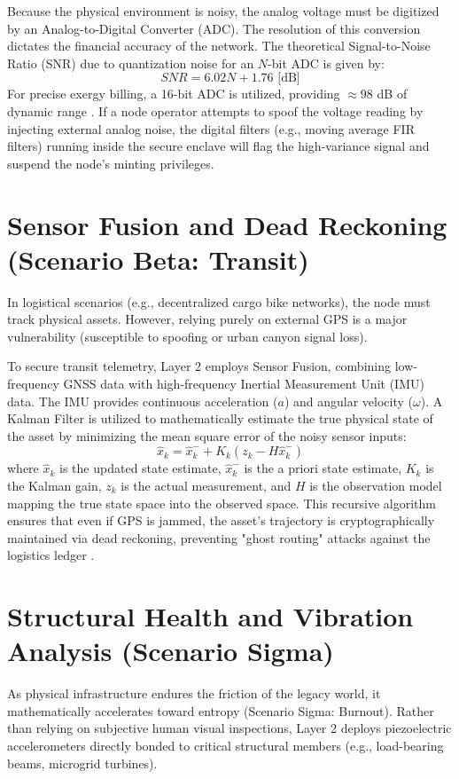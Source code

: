 Because the physical environment is noisy, the analog voltage must be digitized by an Analog-to-Digital Converter (ADC). The resolution of this conversion dictates the financial accuracy of the network. The theoretical Signal-to-Noise Ratio (SNR) due to quantization noise for an $N$-bit ADC is given by:
\begin{equation}
SNR = 6.02N + 1.76 \text{ [dB]}
\end{equation}
For precise exergy billing, a 16-bit ADC is utilized, providing $\approx 98$ dB of dynamic range \cite{kester2005data}. If a node operator attempts to spoof the voltage reading by injecting external analog noise, the digital filters (e.g., moving average FIR filters) running inside the secure enclave will flag the high-variance signal and suspend the node's minting privileges.

\section{Sensor Fusion and Dead Reckoning (Scenario Beta: Transit)}
In logistical scenarios (e.g., decentralized cargo bike networks), the node must track physical assets. However, relying purely on external GPS is a major vulnerability (susceptible to spoofing or urban canyon signal loss). 

To secure transit telemetry, Layer 2 employs Sensor Fusion, combining low-frequency GNSS data with high-frequency Inertial Measurement Unit (IMU) data. The IMU provides continuous acceleration ($a$) and angular velocity ($\omega$). A Kalman Filter is utilized to mathematically estimate the true physical state of the asset by minimizing the mean square error of the noisy sensor inputs:
\begin{equation}
\hat{x}_k = \hat{x}_{k}^{-} + K_k (z_k - H \hat{x}_{k}^{-})
\end{equation}
where $\hat{x}_k$ is the updated state estimate, $\hat{x}_{k}^{-}$ is the a priori state estimate, $K_k$ is the Kalman gain, $z_k$ is the actual measurement, and $H$ is the observation model mapping the true state space into the observed space. This recursive algorithm ensures that even if GPS is jammed, the asset's trajectory is cryptographically maintained via dead reckoning, preventing "ghost routing" attacks against the logistics ledger \cite{grewal2014kalman}.

\section{Structural Health and Vibration Analysis (Scenario Sigma)}
As physical infrastructure endures the friction of the legacy world, it mathematically accelerates toward entropy (Scenario Sigma: Burnout). Rather than relying on subjective human visual inspections, Layer 2 deploys piezoelectric accelerometers directly bonded to critical structural members (e.g., load-bearing beams, microgrid turbines).

